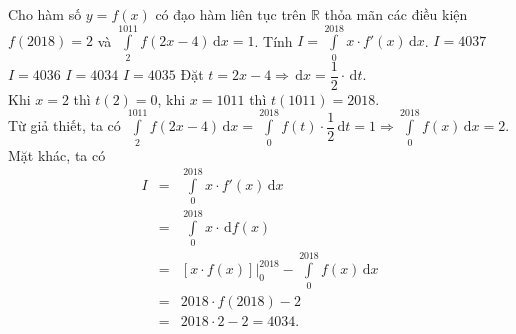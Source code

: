 \begin{ex}%
	Cho hàm số $y=f(x)$ có đạo hàm liên tục trên $\mathbb{R}$ thỏa mãn các điều kiện  $f(2018)=2$ và $\displaystyle\int\limits_2^{1011} f(2x-4)\mathrm{\,d}x=1$. Tính $I=\displaystyle\int\limits_0^{2018} x\cdot f'(x)\mathrm{\,d}x$.
		\choice
	{$I=4037$}
	{$I=4036$}
	{\True $I= 4034$}
	{$I=4035$}
	\loigiai
	{  Đặt $t=2x-4 \Rightarrow \mathrm{\,d}x= \dfrac{1}{2}\cdot \mathrm{\,d}t$.\\
		Khi $x=2$ thì $t(2)=0$, khi $x=1011$ thì $t(1011)=2018.$\\
		Từ giả thiết, ta có $\displaystyle\int\limits_2^{1011} f(2x-4)\mathrm{\,d}x =  \displaystyle\int\limits_0^{2018} f(t)\cdot \dfrac{1}{2} \mathrm{\,d}t =1 \Rightarrow \displaystyle\int\limits_0^{2018} f(x)\mathrm{\,d}x = 2$.\\
		Mặt khác, ta có
		\begin{eqnarray*}
			 I &=&\displaystyle\int\limits_0^{2018} x\cdot f'(x)\mathrm{\,d}x \\
			&= &\displaystyle\int\limits_0^{2018} x\cdot \mathrm{\,d}f(x)\\
			&= &\left[ x \cdot f(x)\right]\Bigr\rvert_{0}^{2018} - \displaystyle\int\limits_0^{2018} f(x)\mathrm{\,d}x\\
			& = &2018\cdot f(2018)- 2 \\
			&= &2018\cdot 2 -2 =4034.
		\end{eqnarray*}
	}
\end{ex}

